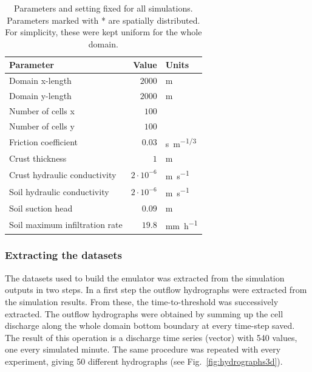 \begin{table}[h]
  \centering
  \caption{Parameters and setting fixed for all simulations. Parameters marked with * are spatially distributed. For simplicity, these were kept uniform for the whole domain.}
  \label{tab:simulations_parameters}
  \begin{threeparttable}
    \begin{tabular}{lrl}
      \toprule
      \textbf{Parameter} & \textbf{Value} & \textbf{Units} \\
      \midrule
      Domain x-length                          &    $\num{2000}$           & \si{\meter}   \\
      Domain y-length                          &    $\num{2000}$           & \si{\meter}   \\
      Number of cells x                        &    $100$             &    \\
      Number of cells y                        &    $100$             &    \\
      Friction coefficient\tnote{*}            &    $0.03$            & \si{s.m^{-1/3}}\\
      Crust thickness\tnote{*}                 &    $1$               & \si{\meter}\\
      Crust hydraulic conductivity\tnote{*}    &    $2\cdot 10^{-6}$  & \si{\meter\per\second}\\
      Soil hydraulic conductivity\tnote{*}     &    $2\cdot 10^{-6}$  & \si{\meter\per\second}\\
      Soil suction head\tnote{*}               &    $0.09$      & \si{\meter}\\
      Soil maximum infiltration rate\tnote{*}  &    $19.8$      & \si{\milli\meter\per\hour}\\
      \bottomrule
    \end{tabular}
  \end{threeparttable}
\end{table}

\subsubsection{Extracting the datasets}
The datasets used to build the emulator was extracted from the simulation outputs in two steps.
In a first step the outflow hydrographs were extracted from the simulation results. From these, the time-to-threshold was successively extracted.
The outflow hydrographs were obtained by summing up the cell discharge along the whole domain bottom boundary at every time-step saved.
The result of this operation is a discharge time series (vector) with \num{540} values, one every simulated minute.
The same procedure was repeated with every experiment, giving \num{50} different hydrographs (see Fig.~\ref{fig:hydrographs3d}).\\

